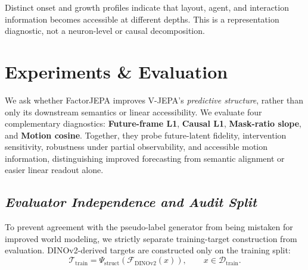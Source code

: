 Distinct onset and growth profiles indicate that layout, agent, and interaction
information becomes accessible at different depths. This is a representation
diagnostic, not a neuron-level or causal decomposition.















































\section{\textbf{Experiments \& Evaluation}}
\label{sec:experiments}

We ask whether FactorJEPA improves V-JEPA's \emph{predictive structure}, rather
than only its downstream semantics or linear accessibility. We evaluate four
complementary diagnostics: \textbf{Future-frame L1}, \textbf{Causal L1},
\textbf{Mask-ratio slope}, and \textbf{Motion cosine}. Together, they probe
future-latent fidelity, intervention sensitivity, robustness under partial
observability, and accessible motion information, distinguishing improved
forecasting from semantic alignment or easier linear readout alone.

\subsection{\textbf{\emph{Evaluator Independence and Audit Split}}}
\label{sec:evaluator_independence}

To prevent agreement with the pseudo-label generator from being mistaken for
improved world modeling, we strictly separate training-target construction from
evaluation. DINOv2-derived targets are constructed only on the training split:
\begin{equation*}
\mathcal T_{\mathrm{train}}
=
\Psi_{\mathrm{struct}}
\left(
\mathcal F_{\mathrm{DINOv2}}(x)
\right),
\qquad
x\in\mathcal D_{\mathrm{train}}.
\end{equation*}

